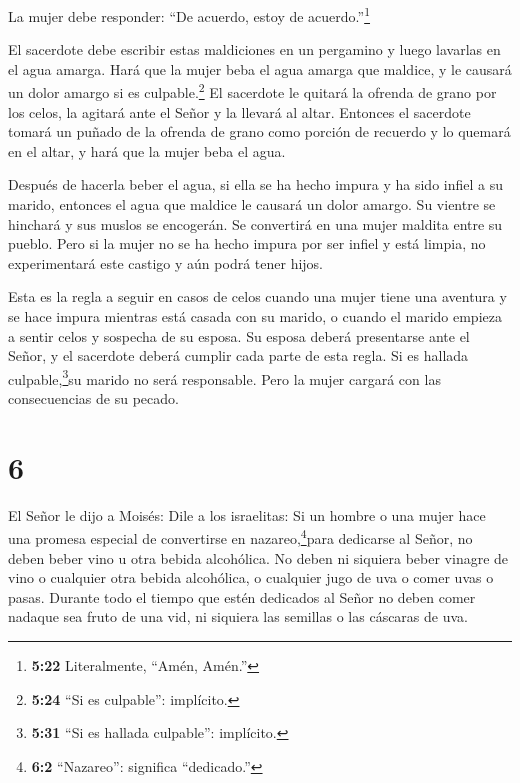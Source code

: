 La mujer debe responder: ``De acuerdo, estoy de acuerdo.''\footnote{\textbf{5:22}
  Literalmente, ``Amén, Amén.''}

 El sacerdote debe escribir estas maldiciones en un
pergamino y luego lavarlas en el agua amarga.  Hará que la
mujer beba el agua amarga que maldice, y le causará un dolor amargo si
es culpable.\footnote{\textbf{5:24} ``Si es culpable'': implícito.}
 El sacerdote le quitará la ofrenda de grano por los celos,
la agitará ante el Señor y la llevará al altar.  Entonces
el sacerdote tomará un puñado de la ofrenda de grano como porción de
recuerdo y lo quemará en el altar, y hará que la mujer beba el agua.

 Después de hacerla beber el agua, si ella se ha hecho
impura y ha sido infiel a su marido, entonces el agua que maldice le
causará un dolor amargo. Su vientre se hinchará y sus muslos se
encogerán. Se convertirá en una mujer maldita entre su pueblo.
 Pero si la mujer no se ha hecho impura por ser infiel y
está limpia, no experimentará este castigo y aún podrá tener hijos.

 Esta es la regla a seguir en casos de celos cuando una
mujer tiene una aventura y se hace impura mientras está casada con su
marido,  o cuando el marido empieza a sentir celos y
sospecha de su esposa. Su esposa deberá presentarse ante el Señor, y el
sacerdote deberá cumplir cada parte de esta regla.  Si es
hallada culpable,\footnote{\textbf{5:31} ``Si es hallada culpable'':
  implícito.}su marido no será responsable. Pero la mujer cargará con
las consecuencias de su pecado.

\hypertarget{section-5}{%
\section{6}\label{section-5}}

 El Señor le dijo a Moisés:  Dile a los
israelitas: Si un hombre o una mujer hace una promesa especial de
convertirse en nazareo,\footnote{\textbf{6:2} ``Nazareo'': significa
  ``dedicado.''}para dedicarse al Señor,  no deben beber
vino u otra bebida alcohólica. No deben ni siquiera beber vinagre de
vino o cualquier otra bebida alcohólica, o cualquier jugo de uva o comer
uvas o pasas.  Durante todo el tiempo que estén dedicados al
Señor no deben comer nadaque sea fruto de una vid, ni siquiera las
semillas o las cáscaras de uva.

